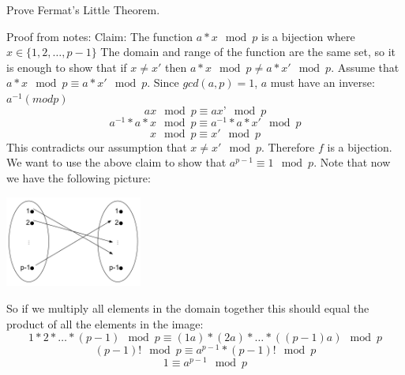 \question Prove Fermat's Little Theorem. 
\begin{solution}[2 in]
Proof from notes: \newline
Claim: The function $a*x \mod p$ is a bijection where $x \in \{1, 2, \dotsc, p-1\}$ \newline
The domain and range of the function are the same set, so it is enough to show that if $x \neq x'$ then $a*x \mod p  \neq  a*x' \mod p$. \newline
Assume that $a*x \mod p  \equiv  a*x' \mod p$.\newline
Since $gcd(a, p) = 1$, $a$ must have an inverse: $a^{-1} (mod p)$
\[ax \mod p \equiv ax’ \mod p\]
\[ a^{-1}*a*x \mod p \equiv  a^{-1}*a*x' \mod p\]
\[x \mod p \equiv x' \mod p \]
This contradicts our assumption that $x \neq x' \mod p$. Therefore $f$ is a bijection.
We want to use the above claim to show that $a^{p-1} \equiv 1 \mod p$. Note that now we have the following picture: \newline
\begin{center}
\includegraphics[width=4.5cm, height=30mm]{proof}
\end{center}
So if we multiply all elements in the domain together this should equal the product of all the elements in the image: \newline
\[ 1 * 2 * \dotsc * (p-1) \mod p \equiv (1a) * (2a) * \dotsc * ((p-1)a) \mod p\]
\[(p-1)! \mod p \equiv a^{p-1} * (p-1)! \mod p\]
\[1 \equiv a^{p-1} \mod p \]
\end{solution}

